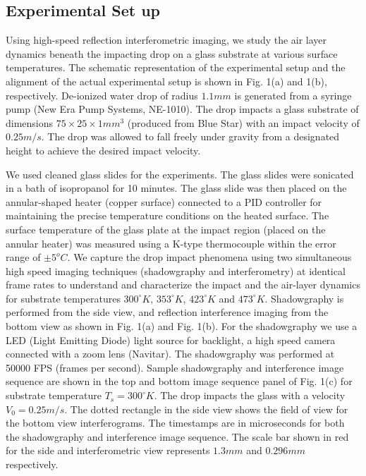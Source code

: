 \documentclass{jfm}
\begin{document}
 \subsection{Experimental Set up}
Using high-speed reflection interferometric imaging, we study the air layer dynamics beneath the impacting drop on a glass substrate at various surface temperatures. The schematic representation of the experimental setup and the alignment of the actual experimental setup is shown in Fig. 1(a) and 1(b), respectively. De-ionized water drop of radius $1.1 mm$ is generated from a syringe pump (New Era Pump Systems, NE-1010). The drop impacts a glass substrate of dimensions $75\times25\times1 mm^3$ (produced from Blue Star) with an impact velocity of $0.25 m/s$. The drop was allowed to fall freely under gravity from a designated height to achieve the desired impact velocity.

We used cleaned glass slides for the experiments. The glass slides were sonicated in a bath of isopropanol for 10 minutes. The glass slide was then placed on the annular-shaped heater (copper surface) connected to a PID controller for maintaining the precise temperature conditions on the heated surface. The surface temperature of the glass plate at the impact region (placed on the annular heater) was measured using a K-type thermocouple within the error range of $\pm5^oC$. We capture the drop impact phenomena using two simultaneous high speed imaging techniques (shadowgraphy and interferometry) at identical frame rates to understand and characterize the impact and the air-layer dynamics for substrate temperatures $300^{\circ}K$, $353^{\circ}K$, $423^{\circ}K$ and $473^{\circ}K$. Shadowgraphy is performed from the side view, and reflection interference imaging from the bottom view as shown in Fig. 1(a) and Fig. 1(b). For the shadowgraphy we use a LED (Light Emitting Diode) light source for backlight, a high speed camera connected with a zoom lens (Navitar). The shadowgraphy was performed at 50000 FPS (frames per second). Sample shadowgraphy and interference image sequence are shown in the top and bottom image sequence panel of Fig. 1(c) for substrate temperature $T_s=300^{\circ}K$. The drop impacts the glass with a velocity $V_0=0.25m/s$. The dotted rectangle in the side view shows the field of view for the bottom view interferograms.
The timestamps are in microseconds for both the shadowgraphy and interference image sequence. The scale bar shown in red for the side and interferometric view represents $1.3mm$ and $0.296mm$ respectively.  
\end{document}
